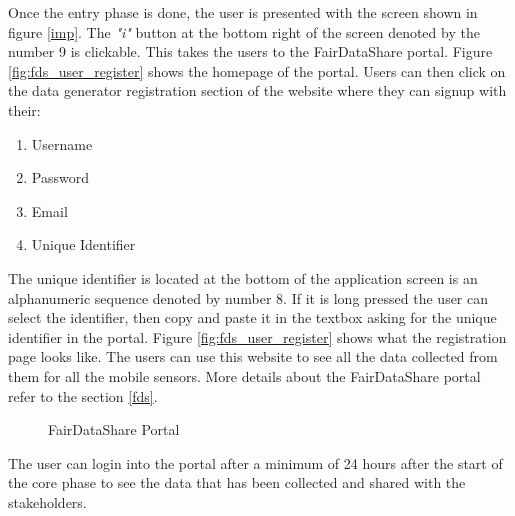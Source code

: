 Once the entry phase is done, the user is presented with the screen shown in figure \ref{imp}.
The {\it "i"} button at the bottom right of the screen denoted by the number 9 is clickable. This takes the users to the FairDataShare portal. Figure \ref{fig:fds_user_register} shows the homepage of the portal. Users can then click on the data generator registration section of the website where they can signup with their:

\begin{enumerate}
    \item Username
    \item Password
    \item Email
    \item Unique Identifier
\end{enumerate}

The unique identifier is located at the bottom of the application screen is an alphanumeric sequence denoted by number 8. If it is long pressed the user can select the identifier, then copy and paste it in the  textbox asking for the unique identifier in the portal. Figure \ref{fig:fds_user_register} shows what the registration page looks like.
The users can use this website to see all the data collected from them for all the mobile sensors. More details about the FairDataShare portal
refer to the section \ref{fds}.

\begin{figure}[htp]
  \hspace{1em}
  \caption{FairDataShare Portal}
  \label{fig:first}
\end{figure}

The user can  login into the portal after a minimum of 24 hours after the start of the core phase to see the data that has been collected and shared with the stakeholders. 

